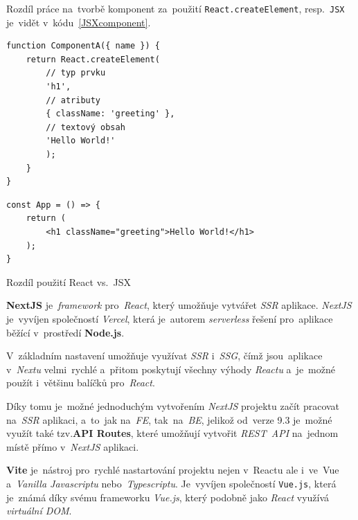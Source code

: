 \documentclass[11pt,a4paper]{report}
\let\oldacrshort\acrshort
\renewcommand{\acrshort}[1]{\emph{\normalsize\color[rgb]{0,0,0}\noindent\oldacrshort{#1}}}
\begin{document}
            Rozdíl práce na~tvorbě komponent za~použití \texttt{React.createElement}, resp.~\texttt{JSX} je~vidět v~kódu~\ref{JSXcomponent}.
            \begin{code}
                \centering
                \begin{minipage}{0.45\textwidth}
                    \begin{verbatim}
function ComponentA({ name }) {
    return React.createElement(
        // typ prvku
        'h1',
        // atributy
        { className: 'greeting' },
        // textový obsah
        'Hello World!'
        );
    }
}
                    \end{verbatim}
                \end{minipage}
                \begin{minipage}{0.45\textwidth}
                    \begin{verbatim}
const App = () => {
    return (
        <h1 className="greeting">Hello World!</h1>
    );
}
                    \end{verbatim}
                \end{minipage}
                \caption{Rozdíl použití React vs.~JSX}
                \label{JSXcomponent}
            \end{code}

            \textbf{NextJS} je~\emph{framework} pro~\emph{React}, který umožňuje vytvářet \emph{SSR} aplikace. \emph{NextJS} je~vyvíjen společností \emph{Vercel}, která je~autorem \emph{serverless} řešení pro~aplikace běžící v~prostředí \textbf{Node.js}.

            V~základním nastavení umožňuje využívat \emph{SSR} i~\acrshort{SSG}, čímž jsou~aplikace v~\emph{Nextu} velmi~rychlé a~přitom poskytují všechny výhody \emph{Reactu} a~je~možné použít i~většinu balíčků pro~\emph{React}.

            Díky tomu je~možné jednoduchým vytvořením \emph{NextJS} projektu začít pracovat na~\emph{SSR} aplikaci, a~to~jak na~\acrshort{FE}, tak~na~\acrshort{BE}, jelikož od~verze 9.3 je~možné využít také tzv.\textbf{API Routes}, které umožňují vytvořit \acrshort{REST}~\acrshort{API} na~jednom místě přímo v~\emph{NextJS} aplikaci. \cite{nextjs, nextjs-api-routes, nextjs-changelog-9-3}

            \textbf{Vite} je~nástroj pro~rychlé nastartování projektu nejen v~Reactu ale i~ve~Vue a~\emph{Vanilla Javascriptu} nebo~\emph{Typescriptu}. Je~vyvíjen společností \texttt{Vue.js}, která je~známá díky svému frameworku \emph{Vue.js}, který podobně jako \emph{React} využívá \emph{virtuální DOM}.
\end{document}
